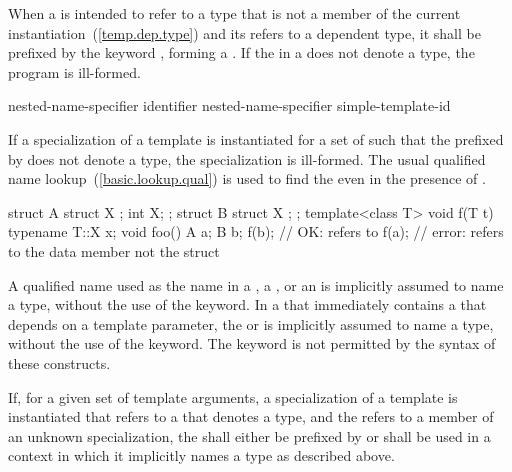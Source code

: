 \pnum
When a  is intended to refer to a type
that is not a member of the current instantiation~(\ref{temp.dep.type})
and its 
refers to a dependent type,
it shall be
prefixed by the keyword , forming a
.
If the  in a 
does not denote a type, the program is ill-formed.

\begin{bnf}
\br
   nested-name-specifier identifier\br
   nested-name-specifier  simple-template-id
\end{bnf}

\pnum
If a specialization of a template is instantiated for a set of
such that the
prefixed by
does not denote a type, the specialization is ill-formed.
The usual qualified name lookup~(\ref{basic.lookup.qual}) is used to find the
even in the presence of
.
\enterexample

\begin{codeblock}
struct A {
  struct X { };
  int X;
};
struct B {
  struct X { };
};
template<class T> void f(T t) {
  typename T::X x;
}
void foo() {
  A a;
  B b;
  f(b);             // OK:  refers to 
  f(a);             // error:  refers to the data member  not the struct 
}
\end{codeblock}
\exitexample

\pnum
A qualified name used as the name in a
,
a
,
or an
is implicitly assumed to name a type, without the use of the
keyword.
In a  that immediately contains a 
that depends on a template parameter, the  or 
is implicitly assumed to name a type, without the use of the  keyword.
\enternote
The
keyword is not permitted by the syntax of these constructs.
\exitnote

\pnum
If, for a given set of template arguments, a specialization of a template is
instantiated that refers to a  that denotes a type,
and the
 refers to a member of an unknown specialization,
the  shall either be
prefixed by  or shall be used in a context in which it
implicitly names a type as described above. \enterexample

